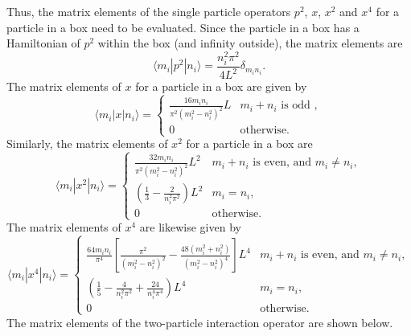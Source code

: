 Thus, the matrix elements of the single particle operators $p^2$, $x$, $x^2$ and $x^4$ for a particle in a box need to be evaluated. Since the particle in a box has a Hamiltonian of $p^2$ within the box (and infinity outside), the matrix elements are
\begin{equation}
 \langle m_i |p^2| n_i \rangle=\frac{n^2_i\pi ^2}{4L^2} \delta_{m_in_i}.
\label{eq:psqmat:appendix}
\end{equation}
The matrix elements of $x$ for a particle in a box are given by
\begin{equation}
 \langle m_i |x| n_i \rangle = \left\{
\begin{array}{lll}
\frac{16m_in_i}{\pi ^2\left(m_i^2-n_i^2\right)^2}L & m_i+n_i \mbox{ is odd }, \\
0 & \mbox{otherwise.}
\end{array}
\right.
\end{equation}
Similarly, the matrix elements of $x^2$ for a particle in a box are
\begin{equation}
\langle m_i |x^2| n_i \rangle = \left\{
\begin{array}{lll}
\frac{32m_in_i}{\pi ^2\left(m_i^2-n_i^2\right)^2}L^2 & m_i+n_i  \mbox{ is even, and } m_i \neq n_i,  \\
\left(\frac{1}{3}-\frac{2}{n_i^2\pi ^2}\right)L^2 & m_i=n_i, \\
0 & \mbox{otherwise.}
\end{array}
\right.
\end{equation}
The matrix elements of $x^4$ are likewise given by
\begin{equation}
 \langle m_i |x^4| n_i \rangle = \left\{
 \begin{array}{lll}
\frac{64m_in_i}{\pi^4}   \left[ \frac{\pi^2}{(m_i^2 - n_i^2)^2} - \frac{
   48(m_i^2 + n_i^2)}{(m_i^2 - n_i^2)^4}\right] L^4 & m_i+n_i  \mbox{ is even, and } m_i \neq n_i, \\
\left(\frac{1}{5}-\frac{4}{n_i^2\pi ^2}+\frac{24}{n_i^4\pi ^4}\right)L^4 & m_i=n_i,\\
0 & \mbox{otherwise.}
\end{array}
\right.
\end{equation}
The matrix elements of the two-particle interaction operator are shown below.
